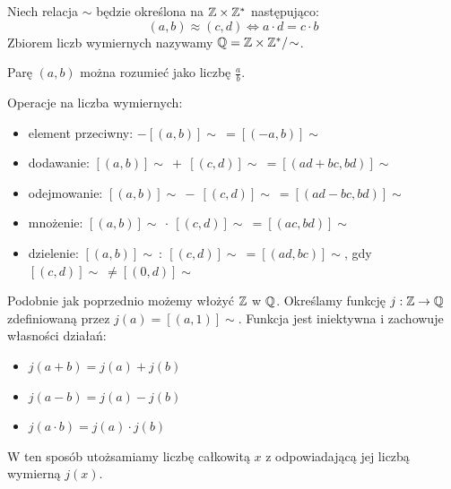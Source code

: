 \begin{definition}
    Niech relacja \( \sim \) będzie określona na \( \mathbb{Z} \times \mathbb{Z}^{*} \) następująco:
    \[
        (a, b) \approx (c, d) \iff a \cdot d = c \cdot b
    \]
    Zbiorem liczb wymiernych nazywamy \( \mathbb{Q} = \mathbb{Z} \times \mathbb{Z}^{*} /\!\sim \).
\end{definition}
Parę \( (a, b) \) można rozumieć jako liczbę \( \frac{a}{b} \).

Operacje na liczba wymiernych:
\begin{itemize}
    \item element przeciwny: \( -[(a, b)]\!\sim \: = [(-a, b)]\!\sim \)
    \item dodawanie: \( [(a, b)]\!\sim \: + \: [(c, d)]\!\sim \: = [(ad + bc, bd)]\!\sim \)
    \item odejmowanie: \( [(a, b)]\!\sim \: - \: [(c, d)]\!\sim \: = [(ad - bc, bd)]\!\sim \)
    \item mnożenie: \( [(a, b)]\!\sim \: \cdot \: [(c, d)]\!\sim \: = [(ac, bd)]\!\sim \)
    \item dzielenie: \( [(a, b)]\!\sim \: : \: [(c, d)]\!\sim \: = [(ad, bc)]\!\sim \), gdy \( [(c, d)]\!\sim \:\ne [(0, d)]\!\sim \)
\end{itemize}


Podobnie jak poprzednio możemy włożyć \( \mathbb{Z} \) w \( \mathbb{Q} \). Określamy funkcję \( j : \mathbb{Z} \rightarrow \mathbb{Q} \) zdefiniowaną przez \( j(a) = [(a, 1)]\!\sim \).
Funkcja jest iniektywna i zachowuje własności działań:
\begin{itemize}
    \item \( j(a + b) = j(a) + j(b) \)
    \item \( j(a - b) = j(a) - j(b) \)
    \item \( j(a \cdot b) = j(a) \cdot j(b) \)
\end{itemize}
W ten sposób utożsamiamy liczbę całkowitą \( x \) z odpowiadającą jej liczbą wymierną \( j(x) \).
